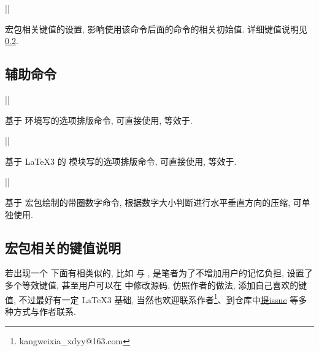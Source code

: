 \documentclass{l3doc}
\begin{document}
\begin{documentation}
\begin{function}[added = 2021-12-23]{\choicesetup}
  \begin{syntax}
    |\choicesetup| 
  \end{syntax}
  宏包相关键值的设置, 影响使用该命令后面的命令的相关初始值. 详细键值说明见 \ref{subsec:键值说明}.
\end{function}



\subsection{辅助命令}

\begin{function}[added = 2021-12-18, updated = 2021-12-22]{\hlistchoice}
  \begin{syntax}
    |\hlistchoice|  
  \end{syntax}
  基于  环境写的选项排版命令, 可直接使用, 等效于.
\end{function}

\begin{function}[added = 2021-12-21, updated = 2021-12-22]{\coffinchoice}
  \begin{syntax}
    |\coffinchoice|  
  \end{syntax}
  基于 \LaTeX3 的  模块写的选项排版命令, 可直接使用, 等效于.
\end{function}

\begin{function}[added = 2021-12-21]{\quan}
  \begin{syntax}
    |\quan| 
  \end{syntax}
  基于  宏包绘制的带圈数字命令, 根据数字大小判断进行水平垂直方向的压缩, 可单独使用. 
  \lstset{ linewidth = 0.4\linewidth }
  \begin{LaTeXautodemo}
      
  \end{LaTeXautodemo}
\end{function}


\subsection{宏包相关的键值说明}\label{subsec:键值说明}
若出现一个  下面有相类似的, 比如  与 , 是笔者为了不增加用户的记忆负担, 设置了多个等效键值, 甚至用户可以在  中修改源码, 仿照作者的做法, 添加自己喜欢的键值, 不过最好有一定 \LaTeX3 基础, 当然也欢迎联系作者\footnote{kangweixia_xdyy@163.com}、到仓库中\href{https://github.com/xkwxdyy/choice-l3/issues}{提issue} 等多种方式与作者联系. 


\end{documentation}
\end{document}
